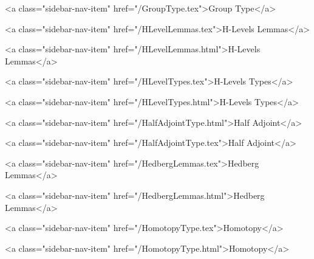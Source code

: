       
        
          <a class="sidebar-nav-item" href="/GroupType.tex">Group Type</a>
        
      
    
      
        
          <a class="sidebar-nav-item" href="/HLevelLemmas.tex">H-Levels Lemmas</a>
        
      
    
      
        
          <a class="sidebar-nav-item" href="/HLevelLemmas.html">H-Levels Lemmas</a>
        
      
    
      
        
          <a class="sidebar-nav-item" href="/HLevelTypes.tex">H-Levels Types</a>
        
      
    
      
        
          <a class="sidebar-nav-item" href="/HLevelTypes.html">H-Levels Types</a>
        
      
    
      
        
          <a class="sidebar-nav-item" href="/HalfAdjointType.html">Half Adjoint</a>
        
      
    
      
        
          <a class="sidebar-nav-item" href="/HalfAdjointType.tex">Half Adjoint</a>
        
      
    
      
        
          <a class="sidebar-nav-item" href="/HedbergLemmas.tex">Hedberg Lemmas</a>
        
      
    
      
        
          <a class="sidebar-nav-item" href="/HedbergLemmas.html">Hedberg Lemmas</a>
        
      
    
      
        
          <a class="sidebar-nav-item" href="/HomotopyType.tex">Homotopy</a>
        
      
    
      
        
          <a class="sidebar-nav-item" href="/HomotopyType.html">Homotopy</a>
        
      
    
